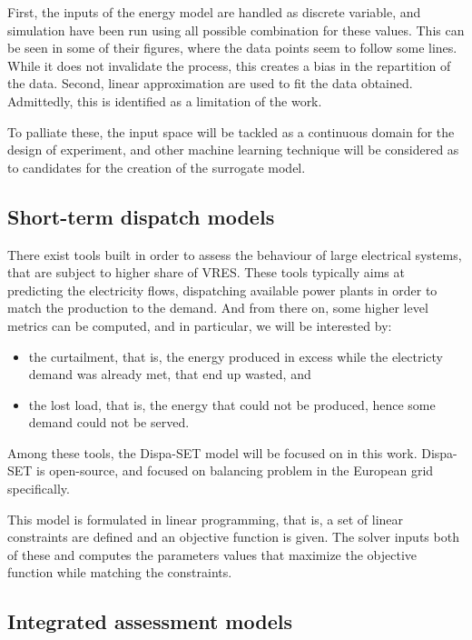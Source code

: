First, the inputs of the energy model are handled as discrete variable, and simulation have been run using all possible combination for these values. This can be seen in some of their figures, where the data points seem to follow some lines. While it does not invalidate the process, this creates a bias in the repartition of the data. Second, linear approximation are used to fit the data obtained. Admittedly, this is identified as a limitation of the work.

To palliate these, the input space will be tackled as a continuous domain for the design of experiment, and other machine learning technique will be considered as to candidates for the creation of the surrogate model.

\subsection{Short-term dispatch models}

There exist tools built in order to assess the behaviour of large electrical systems, that are subject to higher share of VRES. These tools typically aims at predicting the electricity flows, dispatching available power plants in order to match the production to the demand. And from there on, some higher level metrics can be computed, and in particular, we will be interested by:
\begin{itemize}
    \item the curtailment, that is, the energy produced in excess while the electricty demand was already met, that end up wasted, and
    \item the lost load, that is, the energy that could not be produced, hence some demand could not be served.
\end{itemize}

Among these tools, the Dispa-SET model will be focused on in this work. Dispa-SET is open-source, and focused on balancing problem in the European grid specifically.

This model is formulated in linear programming, that is, a set of linear constraints are defined and an objective function is given. The solver inputs both of these and computes the parameters values that maximize the objective function while matching the constraints.

\subsection{Integrated assessment models}

